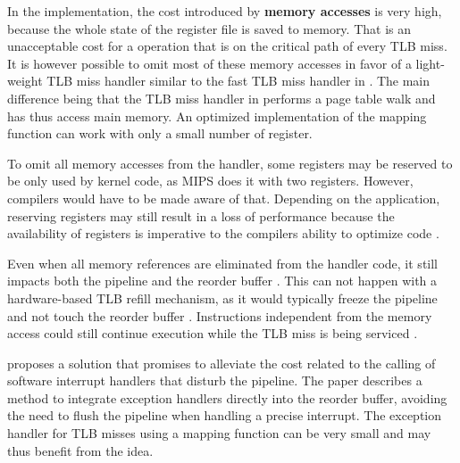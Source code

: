 In the implementation, the cost introduced by \textbf{memory accesses} is very high, because the whole state of the register file is saved to memory. That is an unacceptable cost for a operation that is on the critical path of every TLB miss. It is however possible to omit most of these memory accesses in favor of a light-weight TLB miss handler similar to the fast TLB miss handler in \cite{heiserAnatomyHighPerformanceMicrokernel}. The main difference being that the TLB miss handler in \cite{heiserAnatomyHighPerformanceMicrokernel} performs a page table walk and has thus access main memory. An optimized implementation of the mapping function can work with only a small number of register.

To omit all memory accesses from the handler, some registers may be reserved to be only used by kernel code, as MIPS does it with two registers. However, compilers would have to be made aware of that. Depending on the application, reserving registers may still result in a loss of performance because the availability of registers is imperative to the compilers ability to optimize code \cite{elphinstone2013l3}.

Even when all memory references are eliminated from the handler code, it still impacts both the pipeline and the reorder buffer \cite{jacobSoftwaremanagedAddressTranslation1997}. This can not happen with a hardware-based TLB refill mechanism, as it would typically freeze the pipeline and not touch the reorder buffer \cite{bhattacharjee2017architectural}. Instructions independent from the memory access could still continue execution while the TLB miss is being serviced \cite{jacob1998virtualissues}.

\cite{jaleel2001line} proposes a solution that promises to alleviate the cost related to the calling of software interrupt handlers that disturb the pipeline. The paper describes a method to integrate exception handlers directly into the reorder buffer, avoiding the need to flush the pipeline when handling a precise interrupt. The exception handler for TLB misses using a mapping function can be very small and may thus benefit from the idea.





